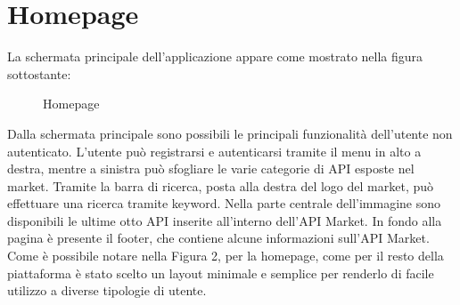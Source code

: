 \newpage
\section{Homepage}

La schermata principale dell'applicazione appare come mostrato nella figura sottostante:

\label{Homepage}
\begin{figure}[H]
	\centering
	\caption{Homepage}
\end{figure}


Dalla schermata principale sono possibili le principali funzionalità dell'utente non autenticato. L'utente può registrarsi e autenticarsi tramite il menu in alto a destra, mentre a sinistra può sfogliare le varie categorie di API esposte nel market. Tramite la barra di ricerca, posta alla destra del logo del market, può effettuare una ricerca tramite keyword. Nella parte centrale dell'immagine sono disponibili le ultime otto API inserite all'interno dell'API Market.
In fondo alla pagina è presente il footer, che contiene alcune informazioni sull'API Market.
Come è possibile notare nella Figura 2, per la homepage, come per il resto della piattaforma è stato scelto un layout minimale e semplice per renderlo di facile utilizzo a diverse tipologie di utente.



